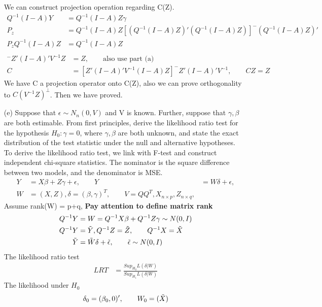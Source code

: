 \begin{itemize}
We can construct projection operation regarding C(Z).
\begin{align*}
Q^{-1}(I-A)Y &= Q^{-1}(I-A)Z \gamma\\
P_z &= Q^{-1}(I-A)Z [(Q^{-1}(I-A)Z)' (Q^{-1}(I-A)Z)]^{-} (Q^{-1}(I-A)Z)' \\
P_z Q^{-1}(I-A)Z &= Q^{-1}(I-A)Z \\
\end{align*}
\begin{align*}
[Z'(I-A)'V^{-1}(I-A)Z]^{-}Z'(I-A)'V^{-1} Z&=  Z, \qquad \text{also use part (a)}\\
C &= [Z'(I-A)'V^{-1}(I-A)Z]^{-}Z'(I-A)'V^{-1}, \qquad CZ = Z
\end{align*}
We have C a projection operator onto C(Z), also we can prove orthogonality to $C(V^{-1} Z)^{\perp}$.
Then we have proved.
\item[(e)] Suppose that $\epsilon \sim N_n(0, V )$ and V is known. Further, suppose that
 $\gamma, \beta$ are both estimable. From first principles, derive the likelihood ratio test for
the hypothesis $H_0: \gamma= 0 $, where $\gamma, \beta$ are both unknown, and state the exact
distribution of the test statistic under the null and alternative hypotheses.\\
To derive the likelihood ratio test, we link with F-test and construct independent chi-square statistics. The nominator is the square difference between two models, and the denominator is MSE.\\
\begin{align*}
Y &= X\beta + Z\gamma + \epsilon, \qquad Y&= W\delta + \epsilon, \\
W &= (X, Z), \delta = (\beta, \gamma)^T, \qquad V = Q Q^{T}, X_{n \times p}, Z_{n \times q}, 
\end{align*}
Assume rank(W) = p+q, \textbf{Pay attention to define matrix rank}
\begin{align*}
Q^{-1}Y &= W = Q^{-1}X \beta + Q^{-1}Z \gamma \sim N(0, I) \\
Q^{-1}Y &= \Tilde{Y}, Q^{-1}Z = \Tilde{Z}, \qquad Q^{-1}X = \Tilde{X}\\
\Tilde{Y} &= \Tilde{W} \delta + \Tilde{\epsilon},  \qquad \Tilde{\epsilon} \sim N(0,I)
\end{align*}
The likelihood ratio test
\begin{align*}
LRT &= \frac{Sup_{H_0} L(\delta| W)}{Sup_{H_1}L(\delta| W)} 
\end{align*}
The likelihood under $H_0$
\begin{align*}
\delta_0 &= (\beta_0, 0)', \qquad W_0 = (\Tilde{X}) \\

\end{align*}
\end{itemize}

